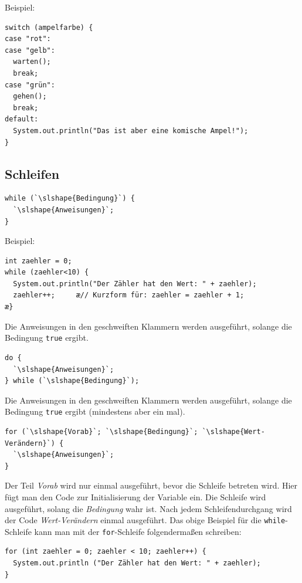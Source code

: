 \pagebreak

Beispiel:

\begin{lstlisting}
switch (ampelfarbe) {
case "rot":
case "gelb": 
  warten();
  break;
case "grün":
  gehen();  
  break;
default:
  System.out.println("Das ist aber eine komische Ampel!");
}
\end{lstlisting}


\subsection{Schleifen}

\begin{compactenum}[a)]
\item
\begin{lstlisting}
while (`\slshape{Bedingung}`) {
  `\slshape{Anweisungen}`;
}
\end{lstlisting}

Beispiel:

\begin{lstlisting}
int zaehler = 0;
while (zaehler<10) {
  System.out.println("Der Zähler hat den Wert: " + zaehler);
  zaehler++;     æ// Kurzform für: zaehler = zaehler + 1;
æ}
\end{lstlisting}

Die Anweisungen in den geschweiften Klammern werden ausgeführt, solange die
Bedingung \lstinline|true| ergibt.

\item 
\begin{lstlisting}
do {
  `\slshape{Anweisungen}`;
} while (`\slshape{Bedingung}`);
\end{lstlisting}


Die Anweisungen in den geschweiften Klammern werden ausgeführt, solange die
Bedingung \lstinline|true| ergibt (mindestens aber ein mal).

\item
\begin{lstlisting}
for (`\slshape{Vorab}`; `\slshape{Bedingung}`; `\slshape{Wert-Verändern}`) {
  `\slshape{Anweisungen}`;
}
\end{lstlisting}

Der Teil \emph{Vorab} wird nur einmal ausgeführt, bevor die Schleife
betreten wird. Hier fügt man den Code zur Initialisierung der Variable ein. Die
Schleife wird ausgeführt, solang die \emph{Bedingung} wahr ist. Nach
jedem Schleifendurchgang wird der Code \emph{Wert-Verändern} einmal
ausgeführt. Das obige Beispiel für die \lstinline|while|-Schleife kann man mit
der \lstinline|for|-Schleife folgendermaßen schreiben:

\begin{lstlisting}
for (int zaehler = 0; zaehler < 10; zaehler++) {
  System.out.println ("Der Zähler hat den Wert: " + zaehler);
}
\end{lstlisting}
\end{compactenum}


